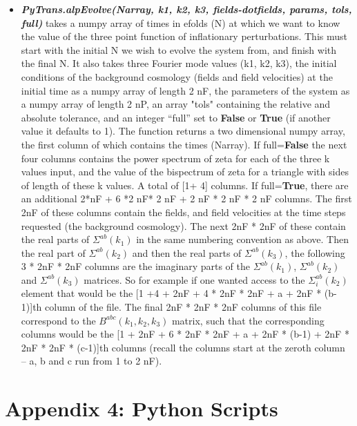 \documentclass[10pt,
amsmath,amssymb,
aps,prd,nofootinbib,eqsecnum,a4paper]{revtex4}
\begin{document}
\begin{itemize}
\item  {\it \bf PyTrans.alpEvolve(Narray, k1, k2, k3, fields-dotfields, params, tols, full)} takes a numpy array of times in efolds (N) 
    at which we want to know the value of the three point function of inflationary perturbations. 
    This must start with the initial N we wish to evolve the system from, and finish with the 
    final N. It also takes three Fourier mode values 
    (k1, k2, k3), the initial conditions of the background cosmology (fields and field velocities) at the initial time as a numpy array of length 2 nF, the parameters of the system as a numpy array of length 2 nP, an array "tols" containing the relative and absolute tolerance, 
    and an integer ``full'' set to {\color{blue}\bf{False}} or {\color{blue}\bf{True}}
    (if another value it defaults to 1). 
    The function returns a two dimensional numpy array, 
     the first column of which contains the times (Narray). 
    If full={\color{blue}\bf{False}} the next four columns contains the power spectrum of zeta 
     for each of the three k values input, and the value of the 
     bispectrum of zeta for a triangle with sides of length of these k values. A total of [1+  4] columns. If full={\color{blue}\bf{True}}, there are 
     an additional 2*nF + 6 *2  nF* 2 nF + 2 nF * 2 nF * 2 nF columns. The first 2nF  of these columns contain 
     the fields, and field velocities at the time steps requested (the background cosmology). The next 2nF * 2nF of these contain the real 
    parts of $\Sigma^{ab}(k_1)$ in the same numbering convention as above. Then the real part of 
    $\Sigma^{ab}(k_2)$ and then the real parts of $\Sigma^{ab}(k_3)$, the following 3 * 2nF * 2nF columns are 
    the imaginary parts of the $\Sigma^{ab}(k_1)$, $\Sigma^{ab}(k_2)$ and $\Sigma^{ab}(k_3)$ matrices. So for 
    example if one wanted access to the $\Sigma_i^{ab}(k_2)$ element that would be the 
    [1 +4 + 2nF + 4 * 2nF * 2nF + a + 2nF * (b-1)]th column of the file. The final 
    2nF * 2nF * 2nF columns of this file correspond to the $B^{abc}(k_1,k_2,k_3)$ matrix, such that     
    the corresponding columns would be the [1 + 2nF + 6 * 2nF * 2nF + a + 2nF * (b-1) + 
    2nF * 2nF * 2nF * (c-1)]th columns (recall the columns start at the zeroth column -- a, b and c run from 1 to 2 nF). 

\end{itemize}

\section*{Appendix 4: Python Scripts}
\end{document}
